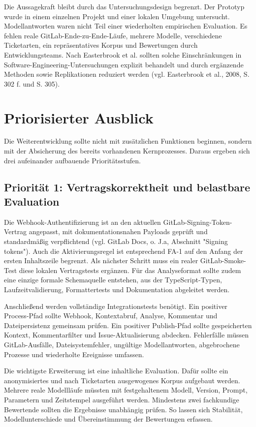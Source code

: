 Die Aussagekraft bleibt durch das Untersuchungsdesign begrenzt. Der Prototyp wurde in einem einzelnen Projekt und einer lokalen Umgebung untersucht. Modellantworten waren nicht Teil einer wiederholten empirischen Evaluation. Es fehlen reale GitLab-Ende-zu-Ende-Läufe, mehrere Modelle, verschiedene Ticketarten, ein repräsentatives Korpus und Bewertungen durch Entwicklungsteams. Nach Easterbrook et al. sollten solche Einschränkungen in Software-Engineering-Untersuchungen explizit behandelt und durch ergänzende Methoden sowie Replikationen reduziert werden (vgl. Easterbrook et al., 2008, S. 302 f. und S. 305).

\section{Priorisierter Ausblick}

Die Weiterentwicklung sollte nicht mit zusätzlichen Funktionen beginnen, sondern mit der Absicherung des bereits vorhandenen Kernprozesses. Daraus ergeben sich drei aufeinander aufbauende Prioritätsstufen.

\subsection{Priorität 1: Vertragskorrektheit und belastbare Evaluation}

Die Webhook-Authentifizierung ist an den aktuellen GitLab-Signing-Token-Vertrag angepasst, mit dokumentationsnahen Payloads geprüft und standardmäßig verpflichtend (vgl. GitLab Docs, o. J.a, Abschnitt "Signing tokens"). Auch die Aktivierungsregel ist entsprechend FA-1 auf den Anfang der ersten Inhaltszeile begrenzt. Als nächster Schritt muss ein realer GitLab-Smoke-Test diese lokalen Vertragstests ergänzen. Für das Analyseformat sollte zudem eine einzige formale Schemaquelle entstehen, aus der TypeScript-Typen, Laufzeitvalidierung, Formattertests und Dokumentation abgeleitet werden.

Anschließend werden vollständige Integrationstests benötigt. Ein positiver Process-Pfad sollte Webhook, Kontextabruf, Analyse, Kommentar und Dateipersistenz gemeinsam prüfen. Ein positiver Publish-Pfad sollte gespeicherten Kontext, Kommentarfilter und Issue-Aktualisierung abdecken. Fehlerfälle müssen GitLab-Ausfälle, Dateisystemfehler, ungültige Modellantworten, abgebrochene Prozesse und wiederholte Ereignisse umfassen.

Die wichtigste Erweiterung ist eine inhaltliche Evaluation. Dafür sollte ein anonymisiertes und nach Ticketarten ausgewogenes Korpus aufgebaut werden. Mehrere reale Modellläufe müssten mit festgehaltenem Modell, Version, Prompt, Parametern und Zeitstempel ausgeführt werden. Mindestens zwei fachkundige Bewertende sollten die Ergebnisse unabhängig prüfen. So lassen sich Stabilität, Modellunterschiede und Übereinstimmung der Bewertungen erfassen.

